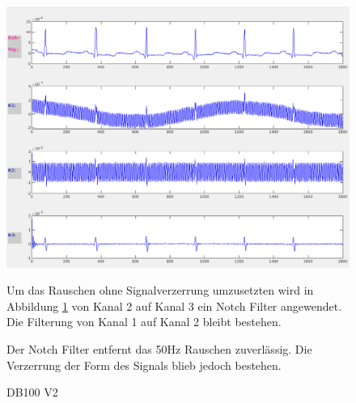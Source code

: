 \documentclass[a4paper,12pt,titlepage]{scrartcl}
\begin{document}
\cleardoublepage

\begin{figure}[ht]
    \begin{minipage}[t]{0.5\linewidth}
        \centering
        \includegraphics[width=0.9\linewidth, valign=t]{Assets/LaborBMT-15-27-08.png}
        \caption{DB100 V2}
        \label{db100v2}
    \end{minipage}%
    \begin{minipage}[t]{0.5\linewidth}
        Um das Rauschen ohne Signalverzerrung umzusetzten wird in Abbildung \ref{db100v2} von Kanal 2 auf Kanal 3 ein Notch Filter angewendet. Die Filterung von Kanal 1 auf Kanal 2 bleibt bestehen.

        Der Notch Filter entfernt das 50Hz Rauschen zuverlässig. Die Verzerrung der Form des Signals blieb jedoch bestehen.
    \end{minipage}
\end{figure}
\end{document}
